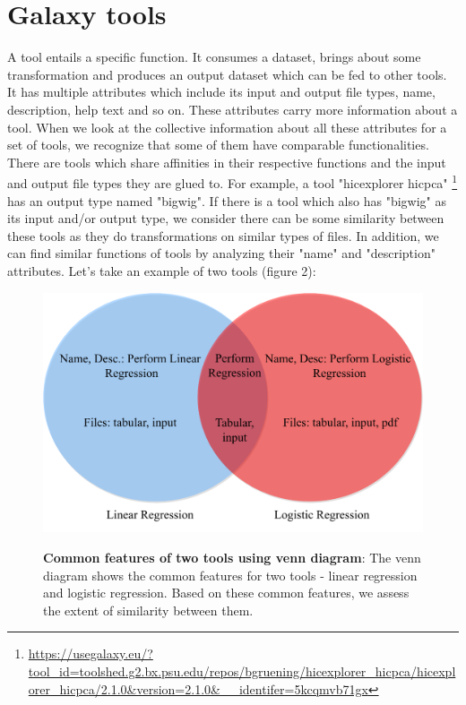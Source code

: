 \section{Galaxy tools}
A tool entails a specific function. It consumes a dataset, brings about some transformation and produces an output dataset which can be fed to other tools. It has multiple attributes which include its input and output file types, name, description, help text and so on. These attributes carry more information about a tool. When we look at the collective information about all these attributes for a set of tools, we recognize that some of them have comparable functionalities. There are tools which share affinities in their respective functions and the input and output file types they are glued to. For example, a tool "hicexplorer hicpca" \footnote{\url{https://usegalaxy.eu/?tool_id=toolshed.g2.bx.psu.edu/repos/bgruening/hicexplorer_hicpca/hicexplorer_hicpca/2.1.0&version=2.1.0&__identifer=5kcqmvb71gx}} has an output type named "bigwig". If there is a tool which also has "bigwig" as its input and/or output type, we consider there can be some similarity between these tools as they do transformations on similar types of files. In addition, we can find similar functions of tools by analyzing their "name" and "description" attributes. Let's take an example of two tools (figure 2):
 
\begin{figure}[h]
\begin{centering}
    {\includegraphics[scale=0.5]{figures/Venn_common_tools_info.pdf}}
    \caption[Common features of two tools using venn diagram]{\textbf{Common features of two tools using venn diagram}: The venn diagram shows the common features for two tools - linear regression and logistic regression. Based on these common features, we assess the extent of similarity between them.}
\end{centering}
\end{figure}

